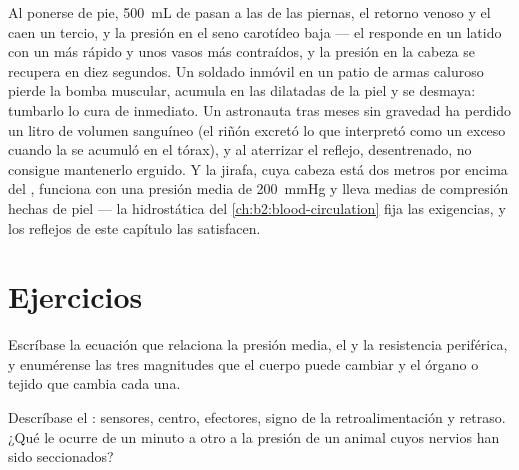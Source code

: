\begin{example}\label{ex:b2:blood-pressure:standing}
Al ponerse de pie, \qty{500}{mL} de  pasan a las  de las
piernas, el retorno venoso y el  caen un tercio, y la
presión en el seno carotídeo baja --- el  responde en un latido
con un  más rápido y unos vasos más contraídos, y la presión en la
cabeza se recupera en diez segundos. Un soldado inmóvil en un patio de
armas caluroso pierde la bomba muscular, acumula  en las 
dilatadas de la piel y se desmaya: tumbarlo lo cura de inmediato. Un
astronauta tras meses sin gravedad ha perdido un litro de volumen
sanguíneo (el riñón excretó lo que interpretó como un exceso cuando la
 se acumuló en el tórax), y al aterrizar el reflejo, desentrenado,
no consigue mantenerlo erguido. Y la jirafa, cuya cabeza está dos metros
por encima del , funciona con una presión media de \qty{200}{mmHg}
y lleva medias de compresión hechas de piel --- la hidrostática del
\cref{ch:b2:blood-circulation} fija las exigencias, y los reflejos de este
capítulo las satisfacen.
\end{example}

\section{Ejercicios}

\begin{exercise}[$\star$]\label{exo:b2:blood-pressure:1}
Escríbase la ecuación que relaciona la presión media, el  y
la resistencia periférica, y enumérense las tres magnitudes que el cuerpo
puede cambiar y el órgano o tejido que cambia cada una.
\end{exercise}

\begin{exercise}[$\star$]\label{exo:b2:blood-pressure:2}
Descríbase el : sensores, centro, efectores, signo de la
retroalimentación y retraso. ¿Qué le ocurre de un minuto a otro a la
presión de un animal cuyos nervios  han sido seccionados?
\end{exercise}

